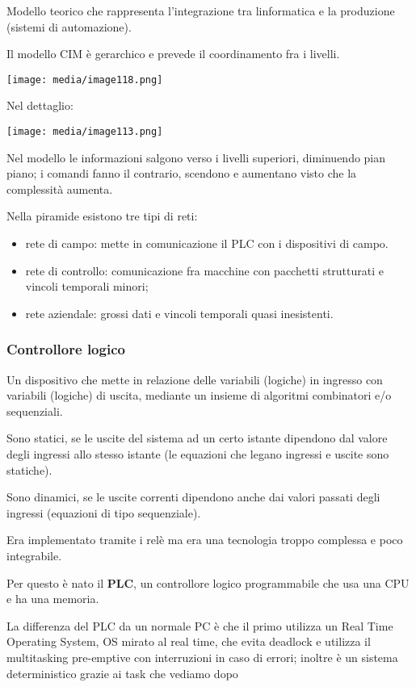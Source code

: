 Modello teorico che rappresenta l'integrazione tra
l\textquotesingle informatica e la produzione (sistemi di automazione).

Il modello CIM è gerarchico e prevede il coordinamento fra i livelli.

\texttt{[image: media/image118.png]}

Nel dettaglio:

\texttt{[image: media/image113.png]}

Nel modello le informazioni salgono verso i livelli superiori,
diminuendo pian piano; i comandi fanno il contrario, scendono e
aumentano visto che la complessità aumenta.

Nella piramide esistono tre tipi di reti:

\begin{itemize}
\item
  rete di campo: mette in comunicazione il PLC con i dispositivi di
  campo.
\item
  rete di controllo: comunicazione fra macchine con pacchetti
  strutturati e vincoli temporali minori;
\item
  rete aziendale: grossi dati e vincoli temporali quasi inesistenti.
\end{itemize}

\subsubsection{Controllore logico}\label{controllore-logico}

Un dispositivo che mette in relazione delle variabili (logiche) in
ingresso con variabili (logiche) di uscita, mediante un insieme di
algoritmi combinatori e/o sequenziali.

Sono statici, se le uscite del sistema ad un certo istante dipendono dal
valore degli ingressi allo stesso istante (le equazioni che legano
ingressi e uscite sono statiche).

Sono dinamici, se le uscite correnti dipendono anche dai valori passati
degli ingressi (equazioni di tipo sequenziale).

Era implementato tramite i relè ma era una tecnologia troppo complessa e
poco integrabile.

Per questo è nato il \textbf{PLC}, un controllore logico programmabile
che usa una CPU e ha una memoria.

La differenza del PLC da un normale PC è che il primo utilizza un Real
Time Operating System, OS mirato al real time, che evita deadlock e
utilizza il multitasking pre-emptive con interruzioni in caso di errori;
inoltre è un sistema deterministico grazie ai task che vediamo dopo

